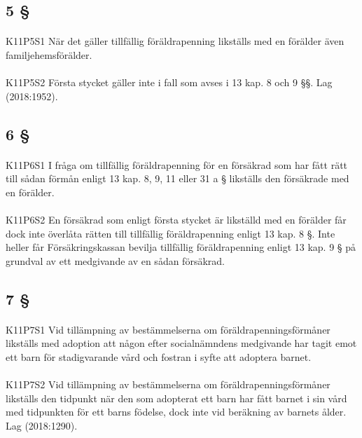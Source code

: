 \documentclass[a4paper,notitlepage,openany,10pt]{book}
\begin{document}
\subsection*{5 §}
\paragraph*{}
{\tiny K11P5S1}
När det gäller tillfällig föräldrapenning likställs med en förälder även familjehemsförälder.
\paragraph*{}
{\tiny K11P5S2}
Första stycket gäller inte i fall som avses i 13 kap. 8 och 9 §§.
Lag (2018:1952).
\subsection*{6 §}
\paragraph*{}
{\tiny K11P6S1}
I fråga om tillfällig föräldrapenning för en försäkrad som har fått rätt till sådan förmån enligt 13 kap. 8, 9, 11 eller 31 a § likställs den försäkrade med en förälder.
\paragraph*{}
{\tiny K11P6S2}
En försäkrad som enligt första stycket är likställd med en förälder får dock inte överlåta rätten till tillfällig föräldrapenning enligt 13 kap. 8 §. Inte heller får Försäkringskassan bevilja tillfällig föräldrapenning enligt 13 kap. 9 § på grundval av ett medgivande av en sådan försäkrad.
\subsection*{7 §}
\paragraph*{}
{\tiny K11P7S1}
Vid tillämpning av bestämmelserna om föräldrapenningsförmåner likställs med adoption att någon efter socialnämndens medgivande har tagit emot ett barn för stadigvarande vård och fostran i syfte att adoptera barnet.
\paragraph*{}
{\tiny K11P7S2}
Vid tillämpning av bestämmelserna om föräldrapenningsförmåner likställs den tidpunkt när den som adopterat ett barn har fått barnet i sin vård med tidpunkten för ett barns födelse, dock inte vid beräkning av barnets ålder.
Lag (2018:1290).
\end{document}
